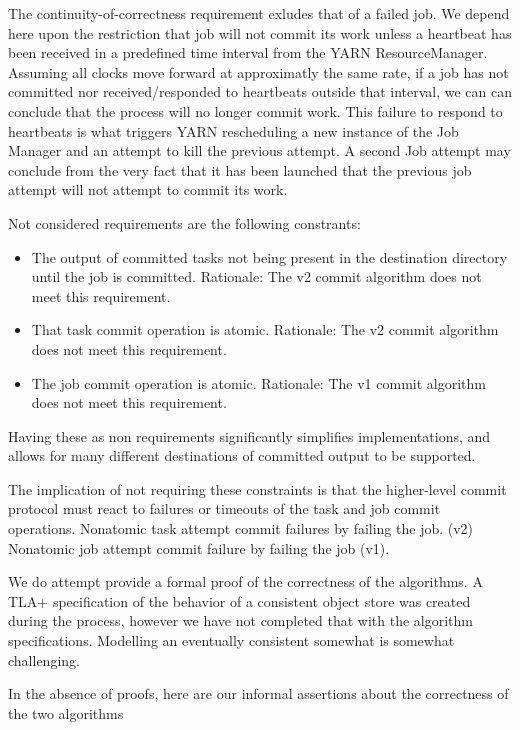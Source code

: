 \documentclass[conference]{IEEEtran}
\begin{document}
The continuity-of-correctness requirement exludes that of a failed job.
We depend here upon the restriction that job will not commit its work unless
a heartbeat has been received in a predefined time interval from the YARN ResourceManager.
Assuming all clocks move forward at approximatly the same rate, if a job has
not committed nor received/responded to heartbeats outside that interval,
we can can conclude that the process will no longer commit work.
This failure to respond to heartbeats is what triggers YARN rescheduling a new
instance of the Job Manager and an attempt to kill the previous attempt.
A second Job attempt may conclude from the very fact that it has been launched
that the previous job attempt will not attempt to commit its work.


Not considered requirements are the following constrants:

\begin{itemize}
  \item The output of committed tasks not being present in the destination directory
  until the job is committed.
  Rationale: The v2 commit algorithm does not meet this requirement.

  \item That task commit operation is atomic.
  Rationale: The v2 commit algorithm does not meet this requirement.

  \item The job commit operation is atomic.
  Rationale: The v1 commit algorithm does not meet this requirement.

\end{itemize}

Having these as non requirements significantly simplifies implementations,
and allows for many different destinations of committed output to be supported.

The implication of not requiring these constraints is that the higher-level
commit protocol must react to failures or timeouts of the task and job
commit operations.
Nonatomic task attempt commit failures by failing the job. (v2)
Nonatomic job attempt commit failure by failing the job (v1).


We do attempt provide a formal proof of the correctness of the algorithms.
A TLA+ specification of the behavior of a consistent object store was created
during the process, however we have not completed that with the algorithm specifications.
Modelling an eventually consistent somewhat is somewhat challenging.

In the absence of proofs,
here are our informal assertions about the correctness of the two algorithms
\end{document}
